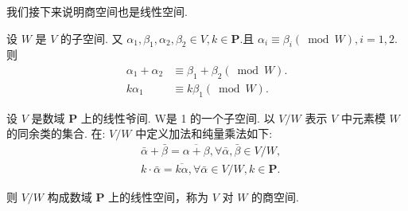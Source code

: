 \documentclass{ctexart}
\begin{document}
我们接下来说明商空间也是线性空间. 

\begin{theorem}
设 $W$ 是 $V$ 的子空间. 又 $\alpha_1, \beta_1, \alpha_2, \beta_2 \in V, k \in \mathbf{P}$.且 $\alpha_i \equiv \beta_i(\bmod W), i=1,2$. 则
$$
\begin{aligned}
\alpha_1+\alpha_2 & \equiv \beta_1+\beta_2(\bmod W) . \\
k \alpha_1 & \equiv k \beta_1(\bmod W) .
\end{aligned}
$$
    
\end{theorem}

\begin{theorem}
 设 $V$ 是数域 $\mathbf{P}$ 上的线性爷间. W是 1 的一个子空间. 以 $V / W$ 表示 $V$ 中元素模 $W$ 的同余类的集合. 在: $V / W$ 中定义加法和纯量乘法如下:
$$
\begin{aligned}
& \bar{\alpha}+\bar{\beta}=\overline{\alpha+\beta}, \forall \bar{\alpha}, \bar{\beta} \in V / W, \\
& k \cdot \bar{\alpha}=\overline{k \alpha}, \forall \bar{\alpha} \in V / W, k \in \mathbf{P} .
\end{aligned}
$$

则 $V / W$ 构成数域 $\mathbf{P}$ 上的线性空间，称为 $V$ 对 $W$ 的商空间.
\end{theorem}
\end{document}
